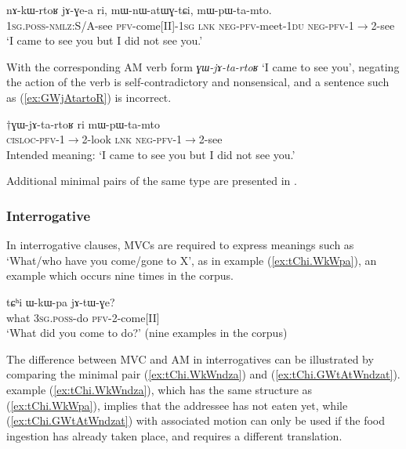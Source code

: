 \documentclass[oneside,a4paper,11pt]{article}
\newcommand{\japhug}[2]{\textit{\phon#1} `#2'}
\newcommand{\fl}{$\rightarrow$}
\begin{document}
\begin{exe}
\ex \label{ex:nAkWrtoR}
\gll nɤ-kɯ-rtoʁ jɤ-ɣe-a ri, mɯ-nɯ-atɯɣ-tɕi, mɯ-pɯ-ta-mto. \\
\textsc{1sg.poss}-\textsc{nmlz}:S/A-see \textsc{pfv}-come[II]-\textsc{1sg} \textsc{lnk} \textsc{neg}-\textsc{pfv}-meet-\textsc{1du} \textsc{neg}-\textsc{pfv}-1\fl2-see \\
\glt `I came to see you but I did not see you.' 
\end{exe}

With the corresponding AM verb form \japhug{ɣɯ-jɤ-ta-rtoʁ}{I came to see you}, negating the action of the verb is self-contradictory and nonsensical, and a sentence such as (\ref{ex:GWjAtartoR}) is incorrect.

\begin{exe}
\ex \label{ex:GWjAtartoR}
\gll $\dagger$ɣɯ-jɤ-ta-rtoʁ ri mɯ-pɯ-ta-mto \\
\textsc{cisloc}-\textsc{pfv}-1\fl2-look \textsc{lnk} \textsc{neg}-\textsc{pfv}-1\fl2-see \\
\glt Intended meaning: `I came to see you but I did not see you.' 
\end{exe}

Additional minimal pairs of the same type are presented in \citet[202-203]{jacques13harmonization}.


\subsubsection{Interrogative} \label{sec:am.interrogative}
In interrogative clauses, MVCs are required to express meanings such as `What/who have you come/gone to X', as in example (\ref{ex:tChi.WkWpa}), an example which occurs nine times in the corpus.

\begin{exe}
\ex \label{ex:tChi.WkWpa}
\gll tɕʰi ɯ-kɯ-pa jɤ-tɯ-ɣe? \\
what \textsc{3sg.poss}-do \textsc{pfv}-2-come[II] \\
\glt `What did you come to do?' (nine examples in the corpus)
\end{exe}

The difference between MVC and AM in interrogatives can be illustrated by comparing the minimal pair  (\ref{ex:tChi.WkWndza}) and (\ref{ex:tChi.GWtAtWndzat}). example (\ref{ex:tChi.WkWndza}), which has the same structure as (\ref{ex:tChi.WkWpa}), implies that the addressee has not eaten yet, while (\ref{ex:tChi.GWtAtWndzat}) with associated motion can only be used if the food ingestion has already taken place, and requires a different translation.
\end{document}
